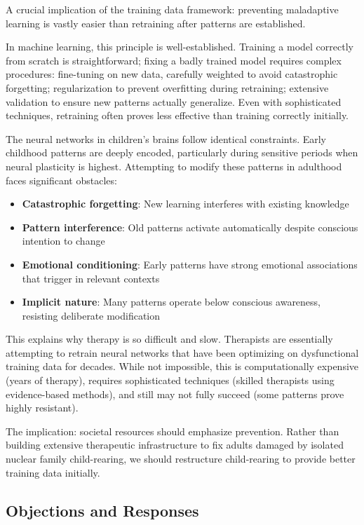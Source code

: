 \documentclass{article}
\begin{document}
A crucial implication of the training data framework: preventing maladaptive learning is vastly easier than retraining after patterns are established.

In machine learning, this principle is well-established. Training a model correctly from scratch is straightforward; fixing a badly trained model requires complex procedures: fine-tuning on new data, carefully weighted to avoid catastrophic forgetting; regularization to prevent overfitting during retraining; extensive validation to ensure new patterns actually generalize. Even with sophisticated techniques, retraining often proves less effective than training correctly initially.

The neural networks in children's brains follow identical constraints. Early childhood patterns are deeply encoded, particularly during sensitive periods when neural plasticity is highest. Attempting to modify these patterns in adulthood faces significant obstacles:

\begin{itemize}
\item \textbf{Catastrophic forgetting}: New learning interferes with existing knowledge
\item \textbf{Pattern interference}: Old patterns activate automatically despite conscious intention to change
\item \textbf{Emotional conditioning}: Early patterns have strong emotional associations that trigger in relevant contexts
\item \textbf{Implicit nature}: Many patterns operate below conscious awareness, resisting deliberate modification
\end{itemize}

This explains why therapy is so difficult and slow. Therapists are essentially attempting to retrain neural networks that have been optimizing on dysfunctional training data for decades. While not impossible, this is computationally expensive (years of therapy), requires sophisticated techniques (skilled therapists using evidence-based methods), and still may not fully succeed (some patterns prove highly resistant).

The implication: societal resources should emphasize prevention. Rather than building extensive therapeutic infrastructure to fix adults damaged by isolated nuclear family child-rearing, we should restructure child-rearing to provide better training data initially.

\subsection{Objections and Responses}
\end{document}
